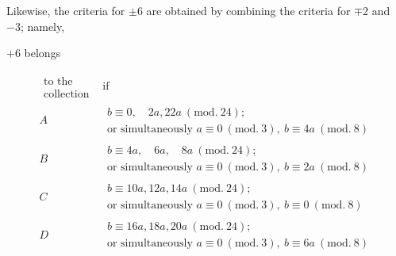 Likewise, the criteria for $\pm6$ are obtained by combining the criteria for $\mp2$ and $-3$; namely,
\begin{center}$+6$ belongs\end{center}
{\small
\[
\begin{array}{c|l}
\substack{\text{to the}\\\text{collection}}&\text{if}\\
A&\begin{aligned}b\equiv0,\quad2a,22a\ (\mathrm{mod.}\ 24);\\\text{or simultaneously }a\equiv0\ (\mathrm{mod.}\ 3),\ b\equiv4a\ (\mathrm{mod.}\ 8)\end{aligned}\\
B&\begin{aligned}b\equiv4a,\quad6a,\quad8a\ (\mathrm{mod.}\ 24);\\\text{or simultaneously }a\equiv0\ (\mathrm{mod.}\ 3),\ b\equiv2a\ (\mathrm{mod.}\ 8)\end{aligned}\\
C&\begin{aligned}b\equiv10a,12a,14a\ (\mathrm{mod.}\ 24);\\\text{or simultaneously }a\equiv0\ (\mathrm{mod.}\ 3),\ b\equiv0\ (\mathrm{mod.}\ 8)\end{aligned}\\
D&\begin{aligned}b\equiv16a,18a,20a\ (\mathrm{mod.}\ 24);\\\text{or simultaneously }a\equiv0\ (\mathrm{mod.}\ 3),\ b\equiv6a\ (\mathrm{mod.}\ 8)\end{aligned}
\end{array}
\]
}

